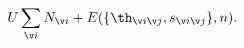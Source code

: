 \begin{equation}
\label{UEthsn}
U\sum_{\v i} N_{\v i}+E(\{\th_{\v i\v j}, s_{\v i\v j} \}, n).
\end{equation}

